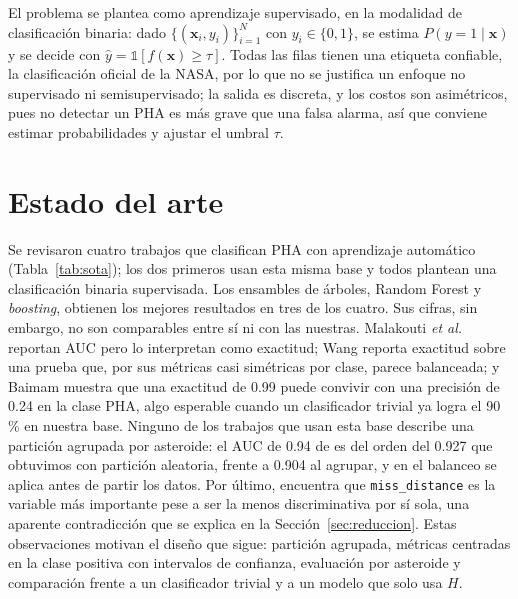 \documentclass[conference]{IEEEtran}
\newcommand{\code}[1]{\texttt{#1}}
\begin{document}
El problema se plantea como aprendizaje supervisado, en la modalidad de clasificación binaria: dado $\{(\mathbf{x}_i,y_i)\}_{i=1}^{N}$ con $y_i\in\{0,1\}$, se estima $P(y=1\mid\mathbf{x})$ y se decide con $\hat y=\mathbb{1}[f(\mathbf{x})\ge\tau]$. Todas las filas tienen una etiqueta confiable, la clasificación oficial de la NASA, por lo que no se justifica un enfoque no supervisado ni semisupervisado; la salida es discreta, y los costos son asimétricos, pues no detectar un PHA es más grave que una falsa alarma, así que conviene estimar probabilidades y ajustar el umbral $\tau$.

\section{Estado del arte}

Se revisaron cuatro trabajos que clasifican PHA con aprendizaje automático (Tabla~\ref{tab:sota}); los dos primeros usan esta misma base y todos plantean una clasificación binaria supervisada. Los ensambles de árboles, Random Forest y \emph{boosting}, obtienen los mejores resultados en tres de los cuatro. Sus cifras, sin embargo, no son comparables entre sí ni con las nuestras. Malakouti \emph{et al.} \cite{malakouti} reportan AUC pero lo interpretan como exactitud; Wang \cite{wang} reporta exactitud sobre una prueba que, por sus métricas casi simétricas por clase, parece balanceada; y Baimam \cite{baimam} muestra que una exactitud de 0.99 puede convivir con una precisión de 0.24 en la clase PHA, algo esperable cuando un clasificador trivial ya logra el 90\,\% en nuestra base. Ninguno de los trabajos que usan esta base describe una partición agrupada por asteroide: el AUC de 0.94 de \cite{malakouti} es del orden del 0.927 que obtuvimos con partición aleatoria, frente a 0.904 al agrupar, y en \cite{buana} el balanceo se aplica antes de partir los datos. Por último, \cite{malakouti} encuentra que \code{miss\_distance} es la variable más importante pese a ser la menos discriminativa por sí sola, una aparente contradicción que se explica en la Sección~\ref{sec:reduccion}. Estas observaciones motivan el diseño que sigue: partición agrupada, métricas centradas en la clase positiva con intervalos de confianza, evaluación por asteroide y comparación frente a un clasificador trivial y a un modelo que solo usa $H$.
\end{document}
